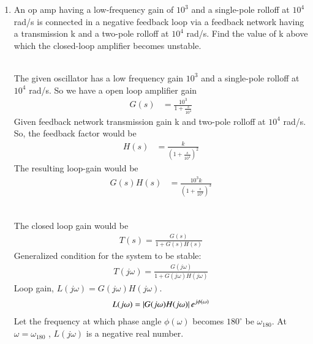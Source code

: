 
\begin{enumerate}[label=\thesection.\arabic*.,ref=\thesection.\theenumi]

\item An op amp having a low-frequency gain of $10^{3}$ and a single-pole rolloff at $10^{4}$ rad/s is connected in a negative feedback loop via a feedback network having a transmission k and a two-pole rolloff at $10^{4}$ rad/s. Find the value of k above which the closed-loop amplifier becomes unstable.


\solution 
\begin{figure}[!ht]
	\begin{center}
		\resizebox{\columnwidth}{!}{}
	\end{center}
\caption{}
\label{fig:ee18btech11006_1}
\end{figure} \\
The given oscillator has a low frequency gain $10^3$ and a single-pole rolloff at $10^4$ rad/s. So we have a open loop amplifier gain 
\begin{align}
G(s)&= \frac{10^3}{1+\frac{s}{10^4}}
\end{align}
Given feedback network transmission gain k and two-pole rolloff at $10^4$ rad/s. So, the feedback factor would be
\begin{align}
H(s)&= \frac{k}{\left(1+\frac{s}{10^4}\right)^2}   
\end{align}
The resulting loop-gain would be 
\begin{align}
G(s)H(s) &= \frac{10^3k}{\left(1+\frac{s}{10^4}\right)^3}
\end{align}
\begin{table}[!ht]
\centering

\caption{}
\label{table:ee18btech11006_Factors}
\end{table}\\
The closed loop gain would be
\begin{align}
T(s)=\frac{G(s)}{1+G(s)H(s)}
\end{align}
Generalized condition for the system to be stable:
\begin{align}
T(j\omega)=\frac{G(j\omega)}{1+G(j\omega)H(j\omega)}
\end{align}
Loop gain, $L(j\omega)=G(j\omega)H(j\omega)$.
\begin{align}
L(j\omega)=\left\vert{G(j\omega)H(j\omega)}\right\vert e^{j\phi(\omega)}
\end{align}
Let the frequency at which phase angle $\phi(\omega)$ becomes $180^{\circ}$ be $\omega_{180}$. At $\omega = \omega_{180}$ , $L(j\omega)$ is a negative real number.

\end{enumerate}
